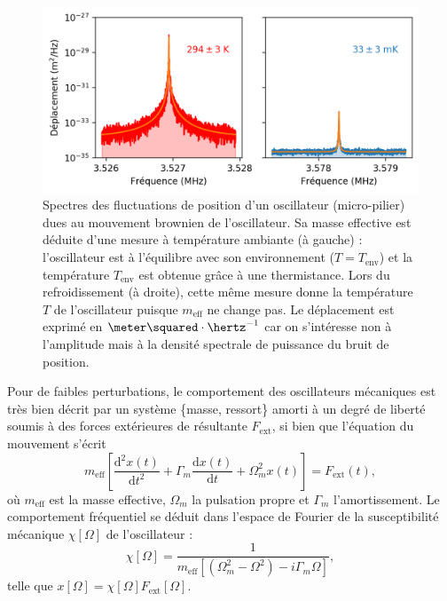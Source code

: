 \documentclass[12pt,a4paper]{article}
\renewcommand{\d}{\mathrm{d}}
\begin{document}
\begin{figure}[b!]
\center
\includegraphics[scale=0.75]{figures/thermal_peak_def_filled.png}
\caption{Spectres des fluctuations de position d'un oscillateur (micro-pilier) dues au mouvement brownien de l'oscillateur.
Sa masse effective est déduite d'une mesure à température ambiante (à gauche) : l'oscillateur est à l'équilibre avec son environnement ($T=T_\mathrm{env}$) et la température $T_\mathrm{env}$ est obtenue grâce à une thermistance.
Lors du refroidissement (à droite), cette même mesure donne la température $T$ de l'oscillateur puisque $m_\mathrm{eff}$ ne change pas. 
Le déplacement est exprimé en $\meter\squared\cdot\hertz^{-1}$ car on s'intéresse non à l'amplitude mais à la densité spectrale de puissance du bruit de position.}
\label{fig:thermal_noise}
\end{figure}

Pour de faibles perturbations, le comportement des oscillateurs mécaniques est très bien décrit par un système \{masse, ressort\} amorti à un degré de liberté soumis à des forces extérieures de résultante $F_\mathrm{ext}$, si bien que l'équation du mouvement s'écrit
\begin{equation}
m_\mathrm{eff}\left[\frac{\d ^2 x(t)}{\d t^2} + \Gamma_m \frac{\d  x(t)}{\d t} +  \Omega_m^2 x(t)\right] = F_\mathrm{ext}(t),
\label{eq:eq_of_motion}
\end{equation}
où $m_\mathrm{eff}$ est la masse effective, $\Omega_m$ la pulsation propre et $\Gamma_m$ l'amortissement.
Le comportement fréquentiel se déduit dans l'espace de Fourier de la susceptibilité mécanique $\chi[\Omega]$ de l'oscillateur :
\begin{equation}
\chi[\Omega] = \frac{1}{m_\mathrm{eff}[(\Omega_m^2-\Omega^2)-i\Gamma_m\Omega]},
\end{equation}
telle que $x[\Omega] = \chi[\Omega]F_\mathrm{ext}[\Omega]$.
\end{document}
